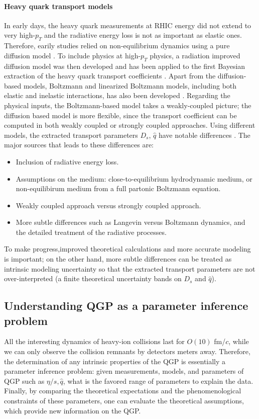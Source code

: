 \paragraph{Heavy quark transport models}
In early days, the heavy quark measurements at RHIC energy did not extend to very high-$p_T$ and the radiative energy loss is not as important as elastic ones.
Therefore, earily studies relied on non-equilibrium dynamics using a pure diffusion model \cite{Moore:2004tg,vanHees:2007me}. 
To include physics at high-$p_T$ physics, a radiation improved diffusion model was then developed \cite{Cao:2013ita} and has been applied to the first Bayesian extraction of the heavy quark transport coefficients \cite{Xu:2017obm}.
Apart from the diffusion-based models, Boltzmann and linearized Boltzmann models, including both elastic and inelastic interactions, has also been developed \cite{Scardina:2017ipo,Cao:2017hhk,Ke:2018tsh}.
Regarding the physical inputs, the Boltzmann-based model takes a weakly-coupled picture; the diffusion based model is more flexible, since the transport coefficient can be computed in both weakly coupled or strongly coupled approaches.
Using different models, the extracted transport parameters $D_s$, $\hat{q}$ have notable differences \cite{Rapp:2018qla,PhysRevC.99.014902,Cao:2018ews}.
The major sources that leads to these differences are:
\begin{itemize}
\item Inclusion of radiative energy loss.
\item Assumptions on the medium: close-to-equilibrium hydrodynamic medium, or non-equilibirum medium from a full partonic Boltzmann equation.
\item Weakly coupled approach versus strongly coupled approach.
\item More subtle differences such as Langevin versus Boltzmann dynamics, and the detailed treatment of the radiative processes.
\end{itemize}
To make progress,improved theoretical calculations and more accurate modeling is important; on the other hand, more subtle differences can be treated as intrinsic modeling uncertainty so that the extracted transport parameters are not over-interpreted (a finite theoretical uncertainty bands on $D_s$ and $\hat{q}$). 

\subsection{Understanding QGP as a parameter inference problem}
All the interesting dynamics of heavy-ion collisions last for $O(10) $ fm/$c$, while we can only observe the collision remnants by detectors meters away.
Therefore, the determination of any intrinsic properties of the QGP is essentially  a parameter inference problem:
given measurements, models, and parameters of QGP such as $\eta/s, \hat{q}$, what is the favored range of parameters to explain the data.
Finally, by comparing the theoretical expectations and the phenomenological constraints of these parameters, one can evaluate the theoretical assumptions, which provide new information on the QGP.


